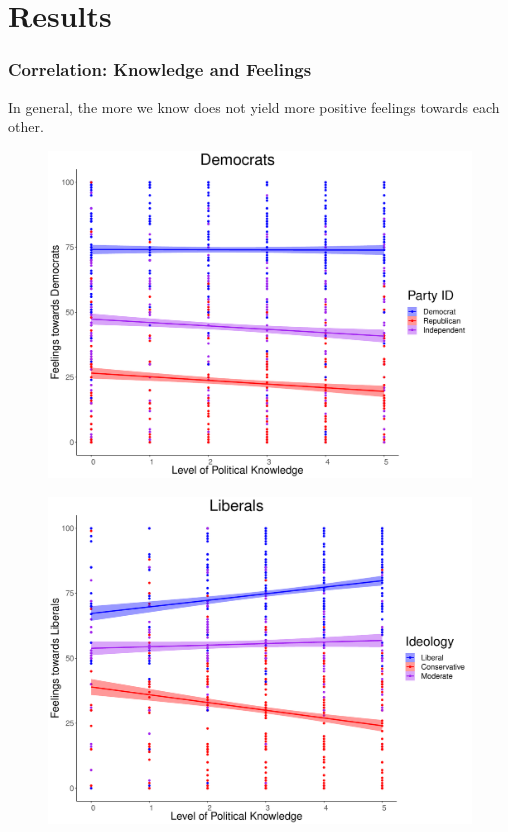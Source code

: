 \documentclass[14pt]{beamer}
\begin{document}
\section{Results}

\begin{frame}
\frametitle{Correlation: Knowledge and Feelings}
\begin{center}
In general, the more we know does not yield more positive feelings towards each other.
\end{center}
\end{frame}

\begin{frame}
\begin{center}
	\begin{figure}[ht!]  
		{	 \includegraphics[width=.9\textwidth]{KFDem}}
	\end{figure}
\end{center}
\end{frame}

\begin{frame}
\begin{center}
	\begin{figure}[ht!]  
		{	 \includegraphics[width=.9\textwidth]{KFLib}}
	\end{figure}
\end{center}
\end{frame}
\end{document}
